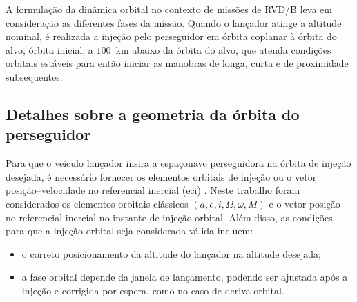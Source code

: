 
\label{sec_eq_mov_orbital_manobras}

A formulação da dinâmica orbital no contexto de missões de RVD/B leva em consideração as diferentes fases da missão.
Quando o lançador atinge a altitude nominal, é realizada a injeção pelo perseguidor em órbita coplanar à órbita do alvo, órbita inicial, a $100$~km abaixo da órbita do alvo, que atenda condições orbitais estáveis para então iniciar as manobras de longa, curta e de proximidade subsequentes.

\subsection{Detalhes sobre a geometria da órbita do perseguidor}

Para que o veículo lançador insira a espaçonave perseguidora na órbita de injeção desejada, é necessário fornecer os elementos orbitais \cite{vallado2007fundamentals} de injeção ou o vetor posição--velocidade no referencial inercial (\gls{eci}) .
Neste trabalho foram considerados os elementos orbitais clássicos $(a, e, i, \Omega, \omega, M)$ e o vetor posição no referencial inercial no instante de injeção orbital.
Além disso, as condições para que a injeção orbital seja considerada válida incluem:

\begin{itemize}
    \item o correto posicionamento da altitude do lançador na altitude desejada;
    \item a fase orbital depende da janela de lançamento, podendo ser ajustada após a injeção e corrigida por espera, como no caso de deriva orbital.
\end{itemize}